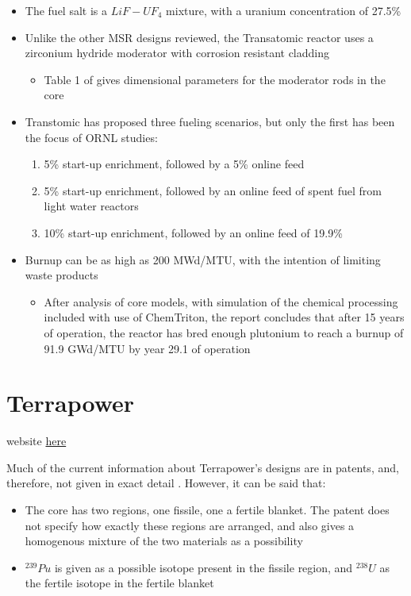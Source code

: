 \documentclass[letterpaper]{article}
\begin{document}
\begin{itemize}
\item The fuel salt is a $LiF - UF_4$ mixture, with a uranium concentration of 27.5\%
\item Unlike the other MSR designs reviewed, the Transatomic reactor uses a zirconium hydride moderator with corrosion resistant cladding
	\begin{itemize}
	\item Table 1 of \cite{robertson_assessment_2017} gives dimensional parameters for the moderator rods in the core
	\end{itemize}
\item Transtomic has proposed three fueling scenarios, but only the first has been the focus of ORNL studies:
	\begin{enumerate}
	\item 5\% start-up enrichment, followed by a 5\% online feed
	\item 5\% start-up enrichment, followed by an online feed of spent fuel from light water reactors
	\item 10\% start-up enrichment, followed by an online feed of 19.9\%
	\end{enumerate}
\item Burnup can be as high as 200 MWd/MTU, with the intention of limiting waste products
	\begin{itemize}
	\item After analysis of core models, with simulation of the chemical processing included with use of ChemTriton, the report concludes that after 15 years of operation, the reactor has bred enough plutonium to reach a burnup of 91.9 GWd/MTU by year 29.1 of operation
	\end{itemize}
\end{itemize}

\section{Terrapower}
website \href{https://terrapower.com/technologies/mcfr}{here}

Much of the current information about Terrapower's designs are in patents, and, therefore, not given in exact detail \cite{hyde_liquid_2015}.  However, it can be said that:

\begin{itemize}
\item The core has two regions, one fissile, one a fertile blanket.  The patent does not specify how exactly these regions are arranged, and also gives a homogenous mixture of the two materials as a possibility
\item ${}^{239}Pu$ is given as a possible isotope present in the fissile region, and ${}^{238}U$ as the fertile isotope in the fertile blanket
\end{itemize}



\end{document}
